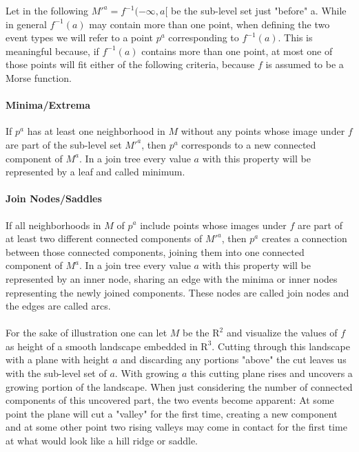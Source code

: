 \documentclass[%
	paper=A4,					%
	twoside=true,				%
	openright,					%
	parskip=full,				%
	chapterprefix=true,			%
	11pt,						%
	headings=normal,			%
	bibliography=totoc,			%
	listof=totoc,				%
	titlepage=on,				%
	captions=tableabove,		%
	draft=false,				%
]{scrreprt}%
\begin{document}
Let in the following \(M'^{a} = f^{-1}(-\infty, a[\) be the sub-level set just "before" a. While in general \(f^{-1}(a)\) may contain more than one point, when defining the two event types we will refer to a point \(p^a\) corresponding to \(f^{-1}(a)\). This is meaningful because, if \(f^{-1}(a)\) contains more than one point, at most one of those points will fit either of the following criteria, because \(f\) is assumed to be a Morse function.
\paragraph{Minima/Extrema} If \(p^a\) has at least one neighborhood in \(M\) without any points whose image under \(f\) are part of the sub-level set \(M'^a\), then \(p^a\) corresponds to a new connected component of \(M^a\). In a join tree every value \(a\) with this property will be represented by a leaf and called minimum.  
\paragraph{Join Nodes/Saddles} If all neighborhoods in \(M\) of \(p^a\) include points whose images under \(f\) are part of at least two different connected components of \(M'^a\), then \(p^a\) creates a connection between those connected components, joining them into one connected component of \(M^a\). In a join tree every value \(a\) with this property will be represented by an inner node, sharing an edge with the minima or inner nodes representing the newly joined components. These nodes are called join nodes and the edges are called arcs.

\paragraph{}For the sake of illustration one can let \(M\) be the $\mathrm{R}^2$ and visualize the values of \(f\) as height of a smooth landscape embedded in $\mathrm{R}^3$. Cutting through this landscape with a plane with height \(a\) and discarding any portions "above" the cut leaves us with the sub-level set of \(a\). With growing \(a\) this cutting plane rises and uncovers a growing portion of the landscape. When just considering the number of connected components of this uncovered part, the two events become apparent: At some point the plane will cut a "valley" for the first time, creating a new component and at some other point two rising valleys may come in contact for the first time at what would look like a hill ridge or saddle.
\end{document}
